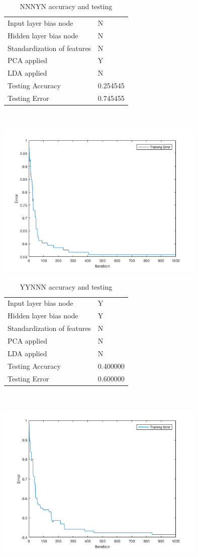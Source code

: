 \documentclass[12pt]{article}
\newcommand{\accuracyAndTestErrorTable}[8]{
  \begin{tabular}{l|l}
    \hline
    Input layer bias node & #1 \\
    Hidden layer bias node & #2 \\
    Standardization of features & #3 \\
    PCA applied & #4 \\
    LDA applied & #5 \\
    \hline
    Testing Accuracy & #6 \\
    Testing Error & #7 \\
    \hline
  \end{tabular}
  ~\\[60pt]
  \caption{#8}
}
\begin{document}
\begin{center}
  \begin{table}[H]
    \begin{varwidth}[b]{0.4\linewidth}
      \centering
      \accuracyAndTestErrorTable{N}{N}{N}{Y}{N}{0.254545}{0.745455}{NNNYN accuracy and testing}
      \label{table:NNNYN}
    \end{varwidth}%
    \hfill
    \begin{minipage}[b]{0.6\linewidth}
      \centering
      \includegraphics[width=100mm]{NNNYN_training_error.png}
      \label{fig:NNNYN}
    \end{minipage}
  \end{table}
\end{center}






\begin{center}
  \begin{table}[H]
    \begin{varwidth}[b]{0.4\linewidth}
      \centering
      \accuracyAndTestErrorTable{Y}{Y}{N}{N}{N}{0.400000}{0.600000}{YYNNN accuracy and testing}
      \label{table:YYNNN}
    \end{varwidth}%
    \hfill
    \begin{minipage}[b]{0.6\linewidth}
      \centering
      \includegraphics[width=100mm]{YYNNN_training_error.png}
      \label{fig:YYNNN}
    \end{minipage}
  \end{table}
\end{center}
\end{document}
